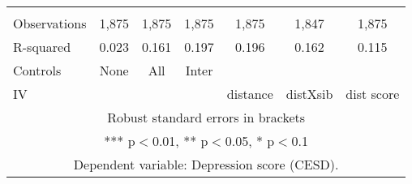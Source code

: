 \begin{tabular}{lcccccc}
 &  &  &  &  &  &  \\
Observations & 1,875 & 1,875 & 1,875 & 1,875 & 1,847 & 1,875 \\
R-squared & 0.023 & 0.161 & 0.197 & 0.196 & 0.162 & 0.115 \\
Controls & None & All & Inter &  &  &  \\
 IV &  &  &  & distance & distXsib & dist score \\ \hline
\multicolumn{7}{c}{ Robust standard errors in brackets} \\
\multicolumn{7}{c}{ *** p$<$0.01, ** p$<$0.05, * p$<$0.1} \\
\multicolumn{7}{c}{ Dependent variable: Depression score (CESD).} \\
\end{tabular}
